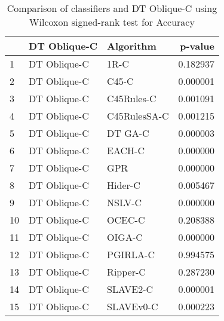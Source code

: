 \begin{table}
\footnotesize
\caption{Comparison of classifiers and DT Oblique-C using Wilcoxon signed-rank test for Accuracy}
\label{tab:DT Oblique-C wilcoxon Accuracy comparison}
\begin{tabular}{lllr}
\hline
 & DT Oblique-C & Algorithm & p-value \\
\hline
1 & DT Oblique-C & 1R-C & 0.182937 \\
2 & DT Oblique-C & C45-C & 0.000001 \\
3 & DT Oblique-C & C45Rules-C & 0.001091 \\
4 & DT Oblique-C & C45RulesSA-C & 0.001215 \\
5 & DT Oblique-C & DT GA-C & 0.000003 \\
6 & DT Oblique-C & EACH-C & 0.000000 \\
7 & DT Oblique-C & GPR & 0.000000 \\
8 & DT Oblique-C & Hider-C & 0.005467 \\
9 & DT Oblique-C & NSLV-C & 0.000000 \\
10 & DT Oblique-C & OCEC-C & 0.208388 \\
11 & DT Oblique-C & OIGA-C & 0.000000 \\
12 & DT Oblique-C & PGIRLA-C & 0.994575 \\
13 & DT Oblique-C & Ripper-C & 0.287230 \\
14 & DT Oblique-C & SLAVE2-C & 0.000001 \\
15 & DT Oblique-C & SLAVEv0-C & 0.000223 \\
\hline
\end{tabular}
\end{table}
